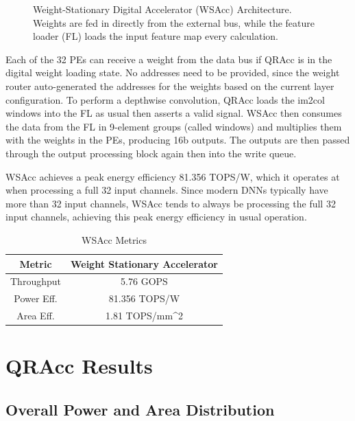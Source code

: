 \begin{figure}[htbp]
    \centering
    
    \caption{Weight-Stationary Digital Accelerator (WSAcc) Architecture. Weights are fed in directly from the external bus, while the feature loader (FL) loads the input feature map every calculation.}
    \label{fig:wsacc}
\end{figure}

Each of the 32 PEs can receive a weight from the data bus if QRAcc is in the digital weight loading state. No addresses need to be provided, since the weight router auto-generated the addresses for the weights based on the current layer configuration. To perform a depthwise convolution, QRAcc loads the im2col windows into the FL as usual then asserts a valid signal. WSAcc then consumes the data from the FL in 9-element groups (called windows) and multiplies them with the weights in the PEs, producing 16b outputs. The outputs are then passed through the output processing block again then into the write queue. 

WSAcc achieves a peak energy efficiency 81.356 TOPS/W, which it operates at when processing a full 32 input channels. Since modern DNNs typically have more than 32 input channels, WSAcc tends to always be processing the full 32 input channels, achieving this peak energy efficiency in usual operation. 

\begin{table}[]
\centering 
\label{tab:wsacc_metrics}
\caption{WSAcc Metrics}
\begin{tabular}{cc}
\hline
\textbf{Metric} & \textbf{Weight Stationary Accelerator} \\ \hline
Throughput      & 5.76 GOPS                              \\
Power Eff.      & 81.356 TOPS/W                          \\
Area Eff.       & 1.81 TOPS/mm\textasciicircum{}2       
\end{tabular}%
\end{table}


\section{QRAcc Results}

\subsection{Overall Power and Area Distribution}


